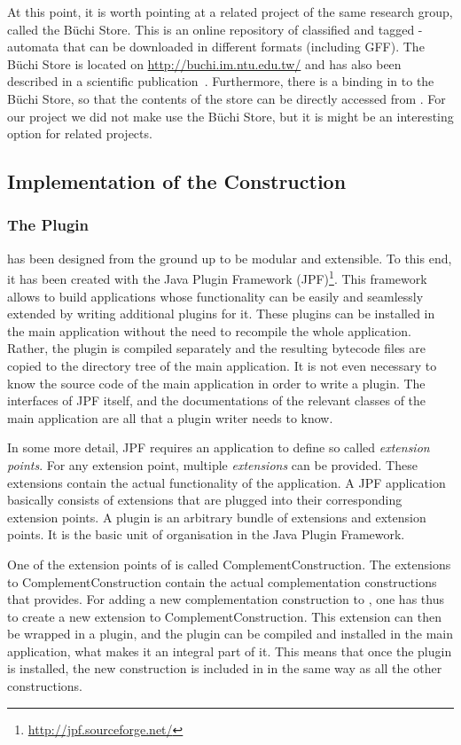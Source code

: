 At this point, it is worth pointing at a related project of the same research group, called the Büchi Store. This is an online repository of classified and tagged \om-automata that can be downloaded in different formats (including GFF). The Büchi Store is located on \url{http://buchi.im.ntu.edu.tw/} and has also been described in a scientific publication~\cite{2011_buchi_store}. Furthermore, there is a binding in \goal{} to the Büchi Store, so that the contents of the store can be directly accessed from \goal{}. For our project we did not make use the Büchi Store, but it is might be an interesting option for related projects.


\subsection{Implementation of the Construction}
\label{4_implementation}
\subsubsection{The \goal{} Plugin}
\goal{} has been designed from the ground up to be modular and extensible. To this end, it has been created with the Java Plugin Framework (JPF)\footnote{\url{http://jpf.sourceforge.net/}}. This framework allows to build applications whose functionality can be easily and seamlessly extended by writing additional plugins for it. These plugins can be installed in the main application without the need to recompile the whole application. Rather, the plugin is compiled separately and the resulting bytecode files are copied to the directory tree of the main application. It is not even necessary to know the source code of the main application in order to write a plugin. The interfaces of JPF itself, and the documentations of the relevant classes of the main application are all that a plugin writer needs to know.

In some more detail, JPF requires an application to define so called \textit{extension points}. For any extension point, multiple \textit{extensions} can be provided. These extensions contain the actual functionality of the application. A JPF application basically consists of extensions that are plugged into their corresponding extension points. A plugin is an arbitrary bundle of extensions and extension points. It is the basic unit of organisation in the Java Plugin Framework.

One of the extension points of \goal{} is called \textsf{ComplementConstruction}. The extensions to \textsf{ComplementConstruction} contain the actual complementation constructions that \goal{} provides. For adding a new complementation construction to \goal, one has thus to create a new extension to \textsf{ComplementConstruction}. This extension can then be wrapped in a plugin, and the plugin can be compiled and installed in the main application, what makes it an integral part of it. This means that once the plugin is installed, the new construction is included in \goal{} in the same way as all the other constructions.

